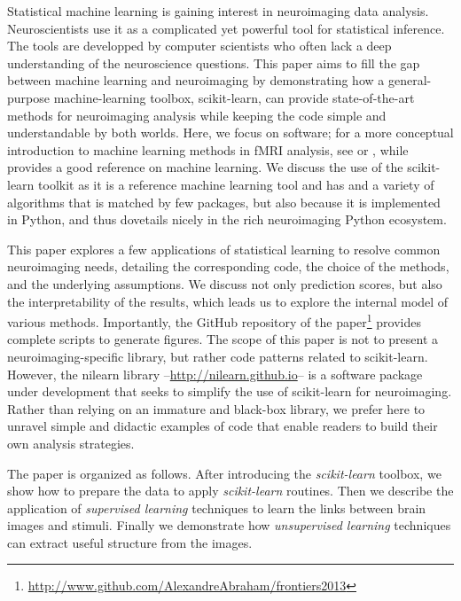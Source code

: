 \documentclass{frontiersSCNS} %
\begin{document}
Statistical machine learning is gaining interest in
neuroimaging data analysis. Neuroscientists use it as a complicated
yet powerful tool for statistical inference. The tools are developped by
computer scientists who often lack a deep understanding of the
neuroscience questions. This paper
aims to fill the gap between machine learning and neuroimaging by demonstrating
how a general-purpose machine-learning toolbox, scikit-learn, can
provide state-of-the-art methods for neuroimaging analysis while keeping
the code simple and
understandable by both worlds. Here, we focus on software; for a 
more conceptual introduction to machine learning methods in fMRI analysis,
see \cite{pereira2009} or \cite{mur2009}, while \cite{hastie2001}
provides a good reference on machine learning.
We discuss the use of the scikit-learn toolkit as it is a reference
machine learning tool and has and a variety of algorithms that is matched by few
packages,
but also because it is implemented in Python,
and thus dovetails nicely in the rich neuroimaging Python ecosystem.

This paper explores a few applications of statistical learning to
resolve common neuroimaging needs, detailing the corresponding code,
the choice of the methods, and the underlying assumptions. We discuss not only
prediction scores, but also the interpretability of the results, which
leads us to explore the internal model of various methods. 
Importantly, the GitHub repository of the
paper\footnote{\url{http://www.github.com/AlexandreAbraham/frontiers2013}}
provides complete scripts to generate figures. 
The scope of this paper is not to present a neuroimaging-specific library,
but rather
code patterns related to scikit-learn. However, the nilearn library --\url{http://nilearn.github.io}-- is a software
package under development
that seeks to simplify the use of scikit-learn for neuroimaging. Rather
than relying on an immature and black-box library, we prefer here to
unravel simple and didactic examples of code that enable readers to
build their own analysis strategies.

The paper is organized as
follows. After introducing the \emph{scikit-learn} toolbox, we show 
how to prepare the data to apply
\emph{scikit-learn} routines. Then we describe the application of \emph{supervised
learning} techniques to learn the links between brain images and
stimuli. Finally we demonstrate how \emph{unsupervised learning}
techniques can extract useful structure from the images.

\end{document}
